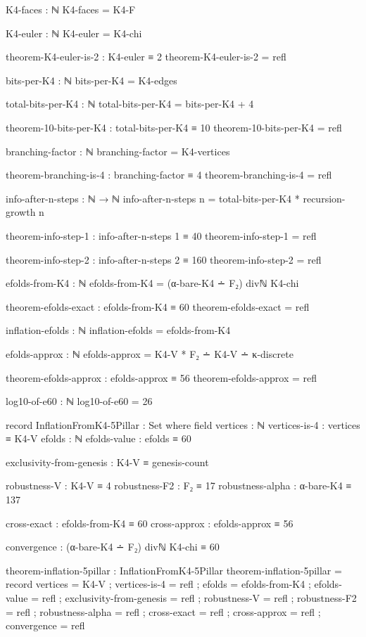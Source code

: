 \documentclass[11pt,a4paper]{book}
\begin{document}
\begin{code}
K4-faces : ℕ
K4-faces = K4-F

K4-euler : ℕ
K4-euler = K4-chi

theorem-K4-euler-is-2 : K4-euler ≡ 2
theorem-K4-euler-is-2 = refl

bits-per-K4 : ℕ
bits-per-K4 = K4-edges

total-bits-per-K4 : ℕ
total-bits-per-K4 = bits-per-K4 + 4

theorem-10-bits-per-K4 : total-bits-per-K4 ≡ 10
theorem-10-bits-per-K4 = refl

branching-factor : ℕ
branching-factor = K4-vertices

theorem-branching-is-4 : branching-factor ≡ 4
theorem-branching-is-4 = refl

info-after-n-steps : ℕ → ℕ
info-after-n-steps n = total-bits-per-K4 * recursion-growth n

theorem-info-step-1 : info-after-n-steps 1 ≡ 40
theorem-info-step-1 = refl

theorem-info-step-2 : info-after-n-steps 2 ≡ 160
theorem-info-step-2 = refl

efolds-from-K4 : ℕ
efolds-from-K4 = (α-bare-K4 ∸ F₂) divℕ K4-chi

theorem-efolds-exact : efolds-from-K4 ≡ 60
theorem-efolds-exact = refl

inflation-efolds : ℕ
inflation-efolds = efolds-from-K4

efolds-approx : ℕ
efolds-approx = K4-V * F₂ ∸ K4-V ∸ κ-discrete

theorem-efolds-approx : efolds-approx ≡ 56
theorem-efolds-approx = refl

log10-of-e60 : ℕ
log10-of-e60 = 26

record InflationFromK4-5Pillar : Set where
  field
    vertices : ℕ
    vertices-is-4 : vertices ≡ K4-V
    efolds : ℕ
    efolds-value : efolds ≡ 60
    
    exclusivity-from-genesis : K4-V ≡ genesis-count
    
    robustness-V : K4-V ≡ 4
    robustness-F2 : F₂ ≡ 17
    robustness-alpha : α-bare-K4 ≡ 137
    
    cross-exact : efolds-from-K4 ≡ 60
    cross-approx : efolds-approx ≡ 56
    
    convergence : (α-bare-K4 ∸ F₂) divℕ K4-chi ≡ 60

theorem-inflation-5pillar : InflationFromK4-5Pillar
theorem-inflation-5pillar = record
  { vertices = K4-V
  ; vertices-is-4 = refl
  ; efolds = efolds-from-K4
  ; efolds-value = refl
  ; exclusivity-from-genesis = refl
  ; robustness-V = refl
  ; robustness-F2 = refl
  ; robustness-alpha = refl
  ; cross-exact = refl
  ; cross-approx = refl
  ; convergence = refl
  }




\end{code}
\end{document}
